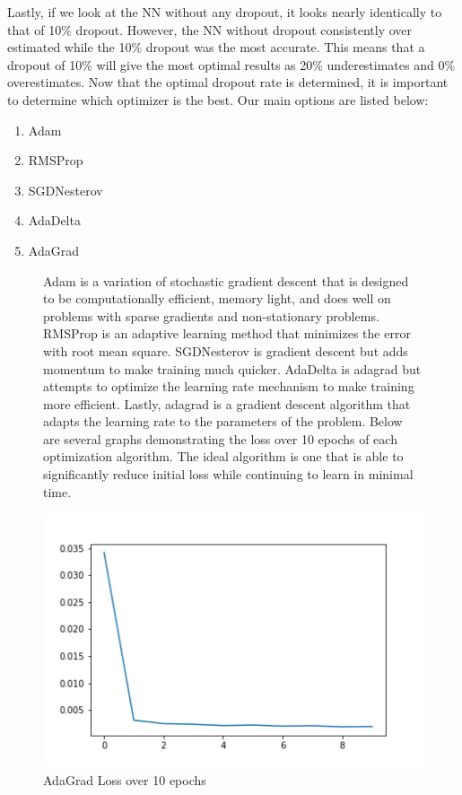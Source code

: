 \documentclass[12pt]{article}
\begin{document}
Lastly, if we look at the NN without any dropout, it looks nearly identically to that of 10\% dropout. However, the NN without dropout consistently over estimated while the 10\% dropout was the most accurate. This means that a dropout of 10\% will give the most optimal results as 20\% underestimates and 0\% overestimates. Now that the optimal dropout rate is determined, it is important to determine which optimizer is the best. Our main options are listed below:

\begin{enumerate}
\item Adam
\item RMSProp
\item SGDNesterov
\item AdaDelta
\item AdaGrad
\end{enumerate}

\begin{figure}[H]
\quad Adam is a variation of stochastic gradient descent that is designed to be computationally efficient, memory light, and does well on problems with sparse gradients and non-stationary problems. RMSProp is an adaptive learning method that minimizes the error with root mean square. SGDNesterov is gradient descent but adds momentum to make training much quicker. AdaDelta is adagrad but attempts to optimize the learning rate mechanism to make training more efficient. Lastly, adagrad is a gradient descent algorithm that adapts the learning rate to the parameters of the problem. Below are several graphs demonstrating the loss over 10 epochs of each optimization algorithm. The ideal algorithm is one that is able to significantly reduce initial loss while continuing to learn in minimal time.  \cite{ruder_2019}


  \includegraphics[width=\linewidth]{images/adagradloss.png}
  \caption{AdaGrad Loss over 10 epochs}
\end{figure}
\end{document}
